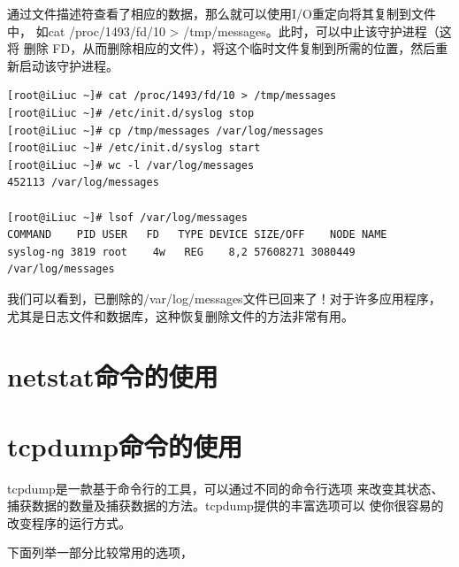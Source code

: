 通过文件描述符查看了相应的数据，那么就可以使用I/O重定向将其复制到文件中，
如cat /proc/1493/fd/10 > /tmp/messages。此时，可以中止该守护进程（这将
  删除 FD，从而删除相应的文件），将这个临时文件复制到所需的位置，然后重
新启动该守护进程。

\begin{verbatim}
[root@iLiuc ~]# cat /proc/1493/fd/10 > /tmp/messages
[root@iLiuc ~]# /etc/init.d/syslog stop
[root@iLiuc ~]# cp /tmp/messages /var/log/messages
[root@iLiuc ~]# /etc/init.d/syslog start
[root@iLiuc ~]# wc -l /var/log/messages 
452113 /var/log/messages

[root@iLiuc ~]# lsof /var/log/messages 
COMMAND    PID USER   FD   TYPE DEVICE SIZE/OFF    NODE NAME
syslog-ng 3819 root    4w   REG    8,2 57608271 3080449 /var/log/messages
\end{verbatim}

我们可以看到，已删除的/var/log/messages文件已回来了！对于许多应用程序，
尤其是日志文件和数据库，这种恢复删除文件的方法非常有用。

\section{netstat命令的使用}
\label{sec:netstatCmd}

\section{tcpdump命令的使用}
\label{sec:tcpdumpCmd}

tcpdump是一款基于命令行的工具，可以通过不同的命令行选项
来改变其状态、捕获数据的数量及捕获数据的方法。tcpdump提供的丰富选项可以
使你很容易的改变程序的运行方式。

下面列举一部分比较常用的选项，

